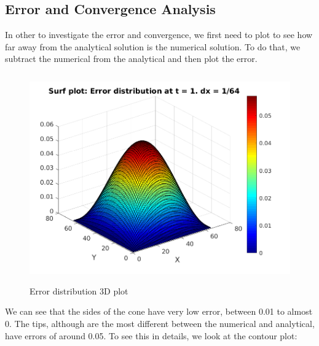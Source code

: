 \documentclass[12pt]{article}
\begin{document}
	\subsection{Error and Convergence Analysis}
	
	 In other to investigate the error and convergence, we first need to plot to see how far away from the analytical solution is the numerical solution. To do that, we subtract the numerical from the analytical and then plot the error. 
	 \begin{figure}[H]
	 	\hfill\includegraphics[width=150mm,height= 90mm]{surf_error.png}\hspace*{\fill}
	 	\caption{Error distribution 3D plot}
	 \end{figure}
 	\noindent
 	We can see that the sides of the cone have very low error, between 0.01 to almost 0. The tips, although are the most different between the numerical and analytical, have errors of around 0.05. To see this in details, we look at the contour plot: 
 	
\end{document}
